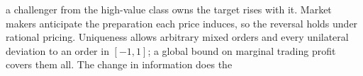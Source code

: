 a challenger from the high-value class owns the target rises with it. Market makers anticipate the preparation each price induces, so the reversal holds under rational pricing. Uniqueness allows arbitrary mixed orders and every unilateral deviation to an order in \([-1,1]\); a global bound on marginal trading profit covers them all. The change in information does the
